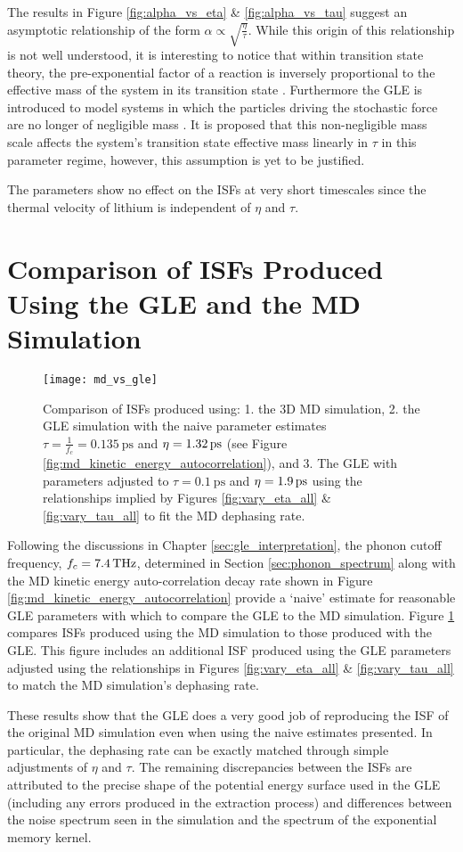 The results in Figure \ref{fig:alpha_vs_eta} \& \ref{fig:alpha_vs_tau} suggest an asymptotic relationship of the form $\alpha \propto \sqrt{\frac{\eta}{\tau}}$. While this origin of this relationship is not well understood, it is interesting to notice that within transition state theory, the pre-exponential factor of a reaction is inversely proportional to the effective mass of the system in its transition state \cite{BLIGAARD2008255}. Furthermore the GLE is introduced to model systems in which the particles driving the stochastic force are no longer of negligible mass \cite{Kubo}. It is proposed that this non-negligible mass scale affects the system's transition state effective mass linearly in $\tau$ in this parameter regime, however, this assumption is yet to be justified.   

The parameters show no effect on the ISFs at very short timescales since the thermal velocity of lithium is independent of $\eta$ and $\tau$.

\section{Comparison of ISFs Produced Using the GLE and the MD Simulation}

\begin{figure}
	\texttt{[image: md\_vs\_gle]}
	\caption{Comparison of ISFs produced using: 1. the 3D MD simulation, 2. the GLE simulation with the naive parameter estimates $\tau=\frac{1}{f_c}=\SI{0.135}{\ps}$ and $\eta=\SI{1.32}{\ips}$ (see Figure \ref{fig:md_kinetic_energy_autocorrelation}), and 3. The GLE with parameters adjusted to $\tau=\SI{0.1}{\ps}$ and $\eta=\SI{1.9}{\ips}$ using the relationships implied by Figures \ref{fig:vary_eta_all} \& \ref{fig:vary_tau_all} to fit the MD dephasing rate.}
	\label{fig:md_vs_gle}
\end{figure}

Following the discussions in Chapter \ref{sec:gle_interpretation},  the phonon cutoff frequency, $f_c=\SI{7.4}{\thz}$, determined in Section \ref{sec:phonon_spectrum} along with the MD kinetic energy auto-correlation decay rate shown in Figure \ref{fig:md_kinetic_energy_autocorrelation} provide a `naive' estimate for reasonable GLE parameters with which to compare the GLE to the MD simulation. Figure \ref{fig:md_vs_gle} compares ISFs produced using the MD simulation to those produced with the GLE. This figure includes an additional ISF produced using the GLE parameters adjusted using the relationships in Figures \ref{fig:vary_eta_all} \& \ref{fig:vary_tau_all} to match the MD simulation's dephasing rate.

These results show that the GLE does a very good job of reproducing the ISF of the original MD simulation even when using the naive estimates presented. In particular, the dephasing rate can be exactly matched through simple adjustments of $\eta$ and $\tau$. The remaining discrepancies between the ISFs are attributed to the precise shape of the potential energy surface used in the GLE (including any errors produced in the extraction process) and differences between the noise spectrum seen in the simulation and the spectrum of the exponential memory kernel. 
